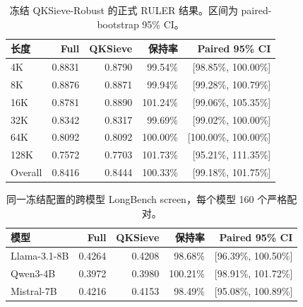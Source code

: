 \begin{table}[t]
\caption{冻结 QKSieve-Robust 的正式 RULER 结果。区间为 paired-bootstrap 95\% CI。}
\label{tab:ruler-formal}
\centering
\small
\begin{tabular}{lrrrr}
\toprule
长度 & Full & QKSieve & 保持率 & Paired 95\% CI \\
\midrule
4K & 0.8831 & 0.8790 & 99.54\% & [98.85\%, 100.00\%] \\
8K & 0.8876 & 0.8871 & 99.94\% & [99.28\%, 100.79\%] \\
16K & 0.8781 & 0.8890 & 101.24\% & [99.06\%, 105.35\%] \\
32K & 0.8342 & 0.8317 & 99.69\% & [99.02\%, 100.00\%] \\
64K & 0.8092 & 0.8092 & 100.00\% & [100.00\%, 100.00\%] \\
128K & 0.7572 & 0.7703 & 101.73\% & [95.21\%, 111.35\%] \\
\midrule
Overall & 0.8416 & 0.8444 & 100.33\% & [99.18\%, 101.75\%] \\
\bottomrule
\end{tabular}
\end{table}

\begin{table}[t]
\caption{同一冻结配置的跨模型 LongBench screen，每个模型 160 个严格配对。}
\label{tab:multimodel-formal}
\centering
\small
\begin{tabular}{lrrrr}
\toprule
模型 & Full & QKSieve & 保持率 & Paired 95\% CI \\
\midrule
Llama-3.1-8B & 0.4264 & 0.4208 & 98.68\% & [96.39\%, 100.50\%] \\
Qwen3-4B & 0.3972 & 0.3980 & 100.21\% & [98.91\%, 101.72\%] \\
Mistral-7B & 0.4216 & 0.4153 & 98.49\% & [95.08\%, 100.89\%] \\
\bottomrule
\end{tabular}
\end{table}
